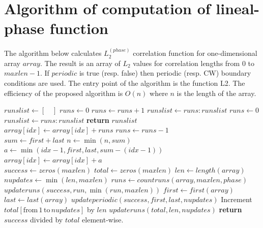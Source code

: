 \documentclass[reprint,amsmath,amssymb,aps,pre]{revtex4-1}
\begin{document}
\appendix
\section{Algorithm of computation of lineal-phase function}
\label{linpathalg}
The algorithm below calculates $L_2^{(phase)}$ correlation function for
one-dimensional array $array$. The result is an array of $L_2$ values for
correlation lengths from $0$ to $maxlen-1$. If $periodic$ is true (resp. false)
then periodic (resp. CW) boundary conditions are used. The entry point of the
algorithm is the function L2. The efficiency of the proposed algorithm is $O(n)$
where $n$ is the length of the array.

\begin{algorithmic}[1]
    \State $runslist \gets [\quad]$
    \State $runs \gets 0$
        \State $runs \gets runs + 1$
        \State $runslist \gets runs:runslist$
        \State $runs \gets 0$
      \EndIf
    \EndFor
      \State $runslist \gets runs:runslist$
    \EndIf
    \State \textbf{return} $runslist$
  \EndProcedure
  \\
      \State $array[idx] \gets array[idx] + runs$
      \State $runs \gets runs - 1$
    \EndFor
  \EndProcedure
  \\
    \State $sum \gets first + last$
    \State $n \gets \min(n, sum)$
      \State $a \gets \min(idx - 1, first, last, sum - (idx - 1))$
      \State $array[idx] \gets array[idx] + a$
    \EndFor
  \EndProcedure
  \\
    \State $success \gets zeros(maxlen)$
    \State $total \gets zeros(maxlen)$
    \State $len \gets length(array)$
    \State $nupdates \gets \min(len, maxlen)$
    \State $runs \gets countruns(array, maxlen, phase)$
      \State $updateruns(success, run, \min(run, maxlen))$
    \EndFor
      \State $first \gets first(array)$
      \State $last \gets last(array)$
        \State $updateperiodic(success, first, last, nupdates)$
      \EndIf
      \State Increment $total[\text{from} \, 1 \, \text{to} \, nupdates]$ by
      $len$
    \Else
      \State $updateruns(total, len, nupdates)$
    \EndIf
    \State \textbf{return} $success$ divided by $total$ element-wise.  
  \EndProcedure
\end{algorithmic}
\end{document}
